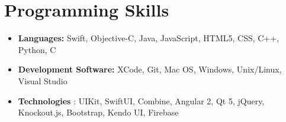 \documentclass[letterpaper,11pt]{article}
\newcommand{\resumeSubItem}[2]{
  \item \textbf{#1} \small{#2} \vspace{-6pt}
}
\newcommand{\resumeSubHeadingListStart}{\begin{itemize}[leftmargin=*]}
\newcommand{\resumeSubHeadingListEnd}{\end{itemize}}
\begin{document}
\section{Programming Skills}
 \resumeSubHeadingListStart
    \resumeSubItem
      {Languages:}{Swift, Objective-C, Java, JavaScript, HTML5, CSS, C++, Python, C} 
    \resumeSubItem
      {Development Software:}{XCode, Git, Mac OS, Windows, Unix/Linux, Visual Studio}
    \resumeSubItem
      {Technologies}{: UIKit, SwiftUI, Combine, Angular 2, Qt 5, jQuery, Knockout.js, Bootstrap, Kendo UI, Firebase}
 \resumeSubHeadingListEnd

\end{document}
